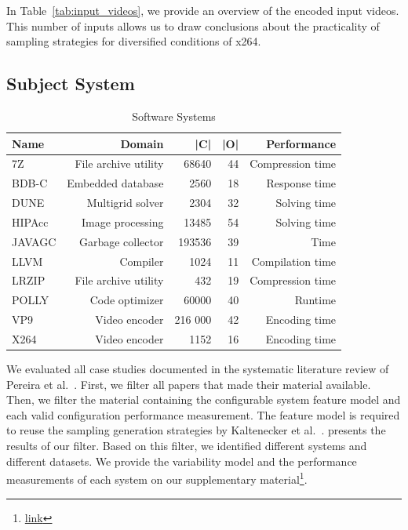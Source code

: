 In Table~\ref{tab:input_videos}, we provide an overview of the encoded input videos.
This number of inputs allows us to draw conclusions about the practicality of sampling strategies for diversified conditions of x264.

\subsection{Subject System} \label{subsec:system}

\begin{table}[ht]
    \centering
    \begin{tabular}{lrrrr}
    \toprule
        Name &  Domain & |C| & |O| & Performance \\
    \midrule
        7Z & File archive utility & 68640 & 44 & Compression time \\
        BDB-C & Embedded database & 2560 & 18 & Response time \\
        DUNE & Multigrid solver & 2304 & 32 & Solving time \\
        HIPAcc & Image processing & 13485 & 54 & Solving time \\
        JAVAGC & Garbage collector & 193536 & 39 & Time \\
        LLVM & Compiler  & 1024 & 11 & Compilation time \\
        LRZIP & File archive utility & 432 & 19 & Compression time \\
        POLLY & Code optimizer & 60000 & 40 & Runtime \\
        VP9 & Video encoder & 216 000 & 42 & Encoding time \\
        X264 & Video encoder & 1152 & 16 & Encoding time \\
    \bottomrule
    \end{tabular}
    \caption{Software Systems}
    \label{tab:system}
\end{table}

We evaluated all case studies documented in the systematic literature review of Pereira et al.~\cite{julianasurvey}. 
First, we filter all papers that made their material available.
Then, we filter the material containing the configurable system feature model and each valid configuration performance measurement.
The feature model is required to reuse the sampling generation strategies by Kaltenecker et al.~\cite{kaltenecker2019}. %
 presents the results of our filter.
Based on this filter, we identified  different systems and  different datasets. 
We provide the variability model and the performance measurements of each system on our supplementary material\footnote{\url{link}}.

